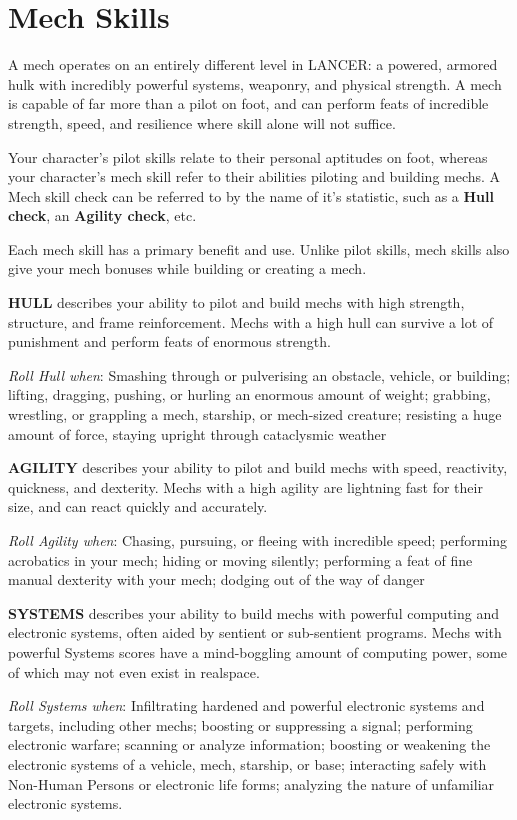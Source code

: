 \section{Mech Skills}

A mech operates on an entirely different level in LANCER: a powered, armored hulk with incredibly powerful systems, weaponry, and physical strength. A mech is capable of far more than a pilot on foot, and can perform feats of incredible strength, speed, and resilience where skill alone will not suffice.

Your character’s pilot skills relate to their personal aptitudes on foot, whereas your character’s mech skill refer to their abilities piloting and building mechs. A Mech skill check can be referred to by the name of it’s statistic, such as a \textbf{Hull check}, an \textbf{Agility check}, etc.

Each mech skill has a primary benefit and use. Unlike pilot skills, mech skills also give your mech bonuses while building or creating a mech.

\textbf{HULL} describes your ability to pilot and build mechs with high strength, structure, and frame reinforcement. Mechs with a high hull can survive a lot of punishment and perform feats of enormous strength.

\textit{Roll Hull when}: Smashing through or pulverising an obstacle, vehicle, or building; lifting, dragging, pushing, or hurling an enormous amount of weight; grabbing, wrestling, or grappling a mech, starship, or mech-sized creature; resisting a huge amount of force, staying upright through cataclysmic weather

\textbf{AGILITY} describes your ability to pilot and build mechs with speed, reactivity, quickness, and dexterity. Mechs with a high agility are lightning fast for their size, and can react quickly and accurately.

\textit{Roll Agility when}: Chasing, pursuing, or fleeing with incredible speed; performing acrobatics in your mech; hiding or moving silently; performing a feat of fine manual dexterity with your mech; dodging out of the way of danger

\textbf{SYSTEMS} describes your ability to build mechs with powerful computing and electronic systems, often aided by sentient or sub-sentient programs. Mechs with powerful Systems scores have a mind-boggling amount of computing power, some of which may not even exist in realspace.

\textit{Roll Systems when}: Infiltrating hardened and powerful electronic systems and targets, including other mechs; boosting or suppressing a signal; performing electronic warfare; scanning or analyze information; boosting or weakening the electronic systems of a vehicle, mech, starship, or base; interacting safely with Non-Human Persons or electronic life forms; analyzing the nature of unfamiliar electronic systems. 

